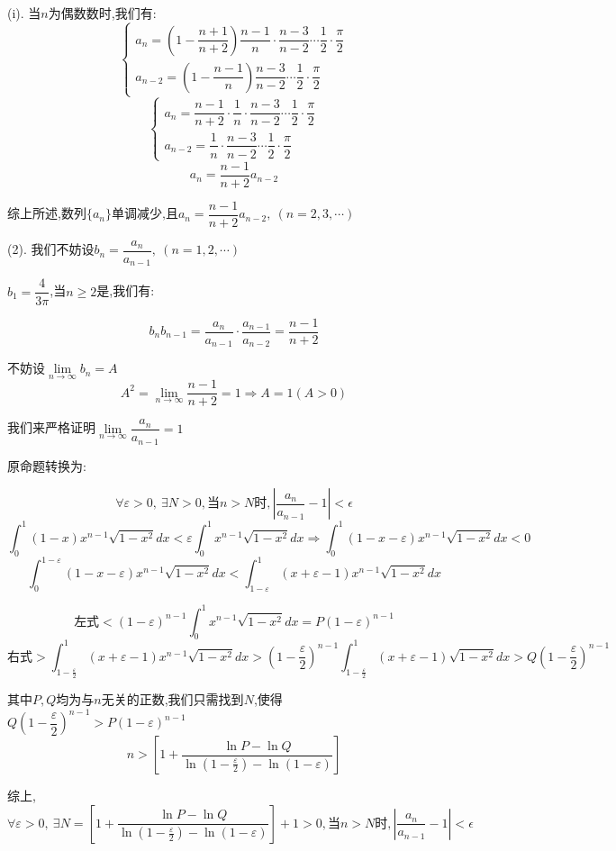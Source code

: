 \begin{solution}
	(i). 当$n$为偶数数时,我们有: 
	$$\left\lbrace 
	\begin{array}{l}
		a_{n}=(1-\dfrac{n+1}{n+2})\dfrac{n-1}{n}\cdot\dfrac{n-3}{n-2}\cdots\dfrac{1}{2}\cdot\dfrac{\pi}{2}\\
		a_{n-2}=(1-\dfrac{n-1}{n})\dfrac{n-3}{n-2}\cdots\dfrac{1}{2}\cdot\dfrac{\pi}{2}
	\end{array}
	\right. $$
	$$\left\lbrace 
	\begin{array}{l}
		a_{n}=\dfrac{n-1}{n+2}\cdot\dfrac{1}{n}\cdot\dfrac{n-3}{n-2}\cdots\dfrac{1}{2}\cdot\dfrac{\pi}{2}\\
		a_{n-2}=\dfrac{1}{n}\cdot\dfrac{n-3}{n-2}\cdots\dfrac{1}{2}\cdot\dfrac{\pi}{2}
	\end{array}
	\right. 
	$$
	$$a_{n}=\frac{n-1}{n+2}a_{n-2}$$
	
	综上所述,$\text{数列}\{a_{n}\}\text{单调减少,且}a_{n}=\dfrac{n-1}{n+2}a_{n-2},\ (n=2,3,\cdots)$
	
	(2). 我们不妨设$b_{n}=\dfrac{a_{n}}{a_{n-1}},\ (n=1,2,\cdots)$
	
	$b_{1}=\dfrac{4}{3\pi}$,当$n\geq 2$是,我们有: 
	
	$$b_{n}b_{n-1}=\dfrac{a_{n}}{a_{n-1}}\cdot\dfrac{a_{n-1}}{a_{n-2}}=\dfrac{n-1}{n+2}$$
	
	不妨设$\lim\limits_{n\to \infty}b_{n}=A$
	$$ A^2=\lim\limits_{n\to \infty}\dfrac{n-1}{n+2}=1\Rightarrow A=1(A>0)$$
	
	我们来严格证明$\lim\limits_{n\to \infty}\dfrac{a_{n}}{a_{n-1}}=1$
	
	原命题转换为: 
	
	$$\forall \varepsilon>0,\ \exists N>0,\text{当}n>N\text{时},|\dfrac{a_{n}}{a_{n-1}}-1|<\epsilon$$
	$$\int_{0}^{1}(1-x)x^{n-1}\sqrt{1-x^2}dx<\varepsilon \int_{0}^{1}x^{n-1}\sqrt{1-x^2}dx\Rightarrow \int_{0}^{1}(1-x-\varepsilon)x^{n-1}\sqrt{1-x^2}dx<0$$
	$$\int_{0}^{1-\varepsilon}(1-x-\varepsilon)x^{n-1}\sqrt{1-x^2}dx<\int_{1-\varepsilon}^{1}(x+\varepsilon-1)x^{n-1}\sqrt{1-x^2}dx$$
	
	$$\text{左式}<(1-\varepsilon)^{n-1}\int_{0}^{1}x^{n-1}\sqrt{1-x^2}dx=P(1-\varepsilon)^{n-1}$$
	$$\text{右式}>\int_{1-\frac{\varepsilon}{2}}^{1}(x+\varepsilon-1)x^{n-1}\sqrt{1-x^2}dx>(1-\frac{\varepsilon}{2})^{n-1}\int_{1-\frac{\varepsilon}{2}}^{1}(x+\varepsilon-1)\sqrt{1-x^2}dx>Q(1-\frac{\varepsilon}{2})^{n-1}$$
	
	其中$P,Q$均为与$n$无关的正数,我们只需找到$N$,使得$Q(1-\dfrac{\varepsilon}{2})^{n-1}>P(1-\varepsilon)^{n-1}$
	$$n>[1+\dfrac{\ln P-\ln Q}{\ln(1-\frac{\varepsilon}{2})-\ln(1-\varepsilon)}]$$
	
	综上,$\forall \varepsilon>0,\ \exists N=[1+\dfrac{\ln P-\ln Q}{\ln(1-\frac{\varepsilon}{2})-\ln(1-\varepsilon)}]+1>0,\text{当}n>N\text{时},|\dfrac{a_{n}}{a_{n-1}}-1|<\epsilon$
\end{solution}

